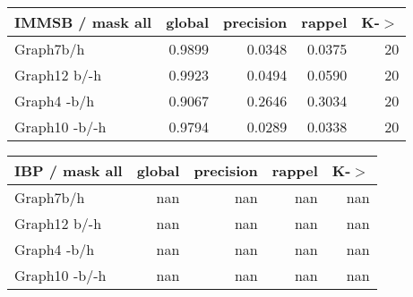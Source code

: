 \begin{table*} 
    \caption{K = 20}
	\begin{minipage}[h]{0.45\linewidth} 
\begin{tabular}{lrrrr}
\hline
 IMMSB / mask all   &   global &   precision &   rappel &     K-\ensuremath{>} \\
\hline
 Graph7b/h          &   0.9899 &      0.0348 &   0.0375 & 20 \\
 Graph12 b/-h       &   0.9923 &      0.0494 &   0.0590 & 20 \\
 Graph4 -b/h        &   0.9067 &      0.2646 &   0.3034 & 20 \\
 Graph10 -b/-h      &   0.9794 &      0.0289 &   0.0338 & 20 \\
\hline
\end{tabular}
\end{minipage}
\hspace{0.5cm}
\begin{minipage}[h]{0.45\linewidth}
\begin{tabular}{lrrrr}
\hline
 IBP / mask all   &   global &   precision &   rappel &   K-\ensuremath{>} \\
\hline
 Graph7b/h        &      nan &         nan &      nan &   nan \\
 Graph12 b/-h     &      nan &         nan &      nan &   nan \\
 Graph4 -b/h      &      nan &         nan &      nan &   nan \\
 Graph10 -b/-h    &      nan &         nan &      nan &   nan \\
\hline
\end{tabular}
\end{minipage}
\end{table*}







